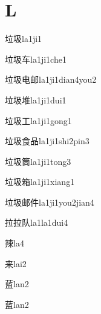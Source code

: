 \section*{L}

\begin{verbete}[8;6]{垃圾}{la1ji1}
\end{verbete}
\begin{verbete}[8;6;4]{垃圾车}{la1ji1che1}
\end{verbete}
\begin{verbete}[8;6;5;7]{垃圾电邮}{la1ji1dian4you2}
\end{verbete}
\begin{verbete}[8;6;11]{垃圾堆}{la1ji1dui1}
\end{verbete}
\begin{verbete}[8;6;3]{垃圾工}{la1ji1gong1}
\end{verbete}
\begin{verbete}[8;6;9;9]{垃圾食品}{la1ji1shi2pin3}
\end{verbete}
\begin{verbete}[8;6;12]{垃圾筒}{la1ji1tong3}
\end{verbete}
\begin{verbete}[8;6;15]{垃圾箱}{la1ji1xiang1}
\end{verbete}
\begin{verbete}[8;6;7;6]{垃圾邮件}{la1ji1you2jian4}
\end{verbete}
\begin{verbete}[8;8;4]{拉拉队}{la1la1dui4}
\end{verbete}
\begin{verbete}[14]{辣}{la4}
\end{verbete}
\begin{verbete}[7]{来}{lai2}
\end{verbete}
\begin{verbete}[13]{蓝}{lan2}
\end{verbete}
\begin{verbete*}[13]{蓝}{lan2}
\end{verbete*}
